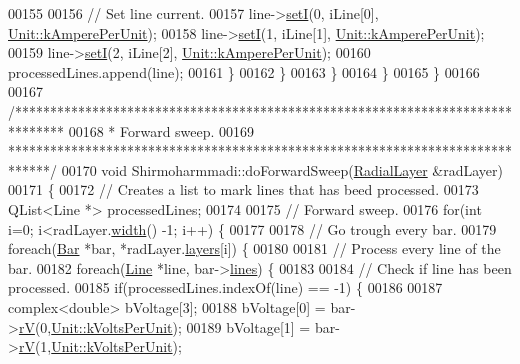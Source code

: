 \begin{DoxyCode}
00155 
00156           \textcolor{comment}{// Set line current.}
00157           line->\hyperlink{group___models_gab01ecad45ee9d81a33b9f5806533066c}{setI}(0, iLine[0], \hyperlink{class_unit_a0794cf6c9682f48296dd4a5315389787aeed3b50e464d581cb630181a3b6a0709}{Unit::kAmperePerUnit});
00158           line->\hyperlink{group___models_gab01ecad45ee9d81a33b9f5806533066c}{setI}(1, iLine[1], \hyperlink{class_unit_a0794cf6c9682f48296dd4a5315389787aeed3b50e464d581cb630181a3b6a0709}{Unit::kAmperePerUnit});
00159           line->\hyperlink{group___models_gab01ecad45ee9d81a33b9f5806533066c}{setI}(2, iLine[2], \hyperlink{class_unit_a0794cf6c9682f48296dd4a5315389787aeed3b50e464d581cb630181a3b6a0709}{Unit::kAmperePerUnit});
00160           processedLines.append(line);
00161         \}
00162       \}
00163     \}
00164   \}
00165 \}
00166 
00167 \textcolor{comment}{/*******************************************************************************}
00168 \textcolor{comment}{ * Forward sweep.}
00169 \textcolor{comment}{ ******************************************************************************/}
00170 \textcolor{keywordtype}{void} Shirmoharmmadi::doForwardSweep(\hyperlink{class_radial_layer}{RadialLayer} &radLayer)
00171 \{
00172 \textcolor{comment}{// Creates a list to mark lines that has beed processed.}
00173   QList<Line *> processedLines;
00174 
00175   \textcolor{comment}{// Forward sweep.}
00176   \textcolor{keywordflow}{for}(\textcolor{keywordtype}{int} i=0; i<radLayer.\hyperlink{class_radial_layer_ae8b32d0711cc6f4dbec832bb07d59a49}{width}() -1; i++) \{
00177 
00178     \textcolor{comment}{// Go trough every bar.}
00179     \textcolor{keywordflow}{foreach}(\hyperlink{class_bar}{Bar} *bar, *radLayer.\hyperlink{class_radial_layer_a714c36b1ab50a7778953e924ddac2787}{layers}[i]) \{
00180 
00181       \textcolor{comment}{// Process every line of the bar.}
00182       \textcolor{keywordflow}{foreach}(\hyperlink{class_line}{Line} *line, bar->\hyperlink{class_bar_a5aabf1f4ac22e20e9cb702a3a7e08eea}{lines}) \{
00183 
00184         \textcolor{comment}{// Check if line has been processed.}
00185         \textcolor{keywordflow}{if}(processedLines.indexOf(line) == -1) \{
00186 
00187           complex<double> bVoltage[3];
00188           bVoltage[0] = bar->\hyperlink{group___models_ga6c83eb997f5038e0b9bbd5472582e0a8}{rV}(0,\hyperlink{class_unit_a55b07dfa9457e1eca2c7194fe0cfc3c1ab44b1310b59fdcdc9df5bbea91da4206}{Unit::kVoltsPerUnit});
00189           bVoltage[1] = bar->\hyperlink{group___models_ga6c83eb997f5038e0b9bbd5472582e0a8}{rV}(1,\hyperlink{class_unit_a55b07dfa9457e1eca2c7194fe0cfc3c1ab44b1310b59fdcdc9df5bbea91da4206}{Unit::kVoltsPerUnit});

\end{DoxyCode}
